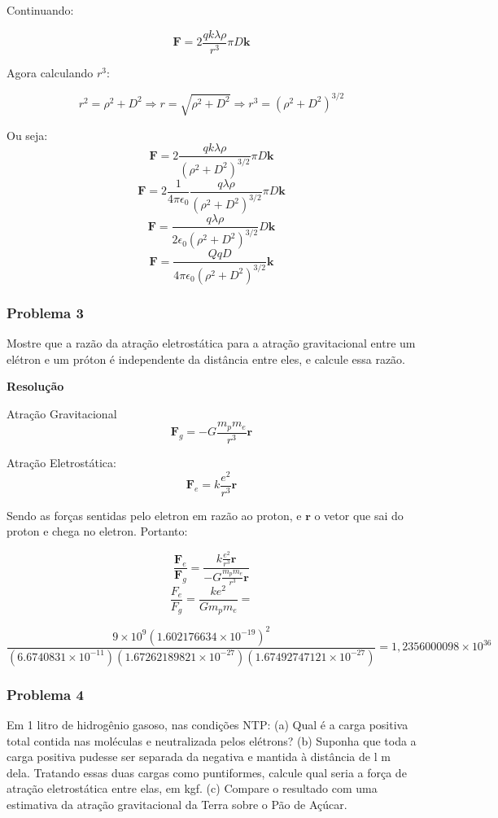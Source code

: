 \documentclass[a4paper, 12pt]{article}
\begin{document}
	Continuando:
	
	\[
	\textbf{F}=2\frac{qk\lambda\rho}{r^3}\pi D\textbf{k}
	\]
	
	Agora calculando $r^3$:
	
	\[
	r^2=\rho^2+D^2\Rightarrow r=\sqrt{\rho^2+D^2}\Rightarrow r^3=\left(\rho^2+D^2\right)^{3/2}
	\]
	
	Ou seja:
	\[
	\textbf{F}=2\frac{qk\lambda\rho}{\left(\rho^2+D^2\right)^{3/2}}\pi D\textbf{k}
	\]
	\[
	\textbf{F}=2\frac{1}{4\pi\epsilon_0}\frac{q\lambda\rho}{\left(\rho^2+D^2\right)^{3/2}}\pi D\textbf{k}
	\]
	\[
	\textbf{F}=\frac{q\lambda\rho}{2\epsilon_0\left(\rho^2+D^2\right)^{3/2}} D\textbf{k}
	\]
	\[
	\textbf{F}=\frac{QqD}{4\pi\epsilon_0\left(\rho^2+D^2\right)^{3/2}}\textbf{k}
	\]
	
	\subsubsection{Problema 3}
	
	Mostre que a razão da atração eletrostática para a atração gravitacional entre um elétron e um próton é independente da distância entre eles, e calcule essa razão. 
	
	
	\textbf{Resolução}
	
	Atração Gravitacional
	\[
	\textbf{F}_g=-G\frac{m_pm_e}{r^3}\textbf{r}
	\]
	
	Atração Eletrostática:
	\[
	\textbf{F}_e=k\frac{e^2}{r^3}\textbf{r}
	\]
	
	Sendo as forças sentidas pelo eletron em razão ao proton, e $\textbf{r}$ o vetor que sai do proton e chega no eletron. Portanto:
	
	\[
	\frac{\textbf{F}_e}{\textbf{F}_g}=\frac{k\frac{e^2}{r^3}\textbf{r}}{-G\frac{m_pm_e}{r^3}\textbf{r}}
	\]
	\[
	\frac{F_e}{F_g}=\frac{ke^2}{Gm_pm_e}=\]
	
	\[\frac{ 9 \times 1{0}^{ 9 }{(1.602176634 \times 10^{-19})}^{ 2 } }{ (6.6740831 \times 10^{-11})(1.67262189821 \times 10^{-27})(1.67492747121 \times 10^{-27}) }=1,2356000098\times 10^{36}
	\]
	
	
	
	
	\subsubsection{Problema 4}
	Em 1 litro de hidrogênio gasoso, nas condições NTP: (a) Qual é a carga positiva total contida nas moléculas e neutralizada pelos elétrons? (b) Suponha que toda a carga positiva pudesse ser separada da negativa e mantida à distância de l m dela. Tratando essas duas cargas como puntiformes, calcule qual seria a força de atração eletrostática entre elas, em kgf. (c) Compare o resultado com uma estimativa da atração gravitacional da Terra sobre o Pão de Açúcar.
	
\end{document}
